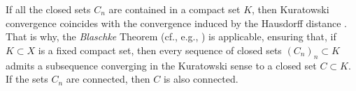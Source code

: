 \documentclass[a4paper,10pt,reqno]{amsart} %
\newcommand{\N}{\mathbb{N}}
\numberwithin{equation}{section}
\newcommand{\Xs}{X}
\begin{document}
If all the
closed sets $C_n$ are contained in a compact set $K$, then  Kuratowski convergence coincides with the convergence induced by the 
Hausdorff distance
 \cite[Prop.\ 4.4.14]{Ambrosio-Tilli}. That is why, the   \emph{Blaschke} %
 Theorem  (cf., e.g., \cite[Thm.\
4.4.15]{Ambrosio-Tilli})  is   applicable, ensuring 
 that, if $K \subset \Xs$ is a
fixed compact set, then every sequence of closed sets $(C_n)_n
\subset K$ admits a subsequence converging in the
Kuratowski sense to
a closed set $C \subset K$. If the sets $C_n$
are connected, then 
  $C$ is  also connected. 
\end{document}
